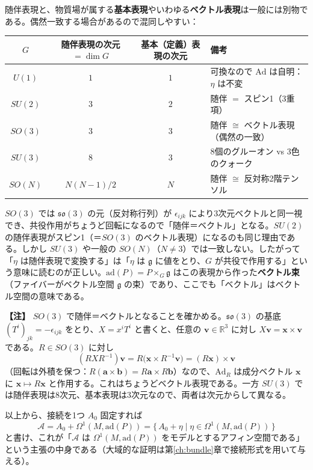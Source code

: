 \documentclass[uplatex, dvipdfmx, book]{jsbook}
\newenvironment{note}{\vspace{1ex}\par\footnotesize\noindent\textbf{【注】}}{\par\vspace{1ex}}
\begin{document}
随伴表現と、物質場が属する\textbf{基本表現}やいわゆる\textbf{ベクトル表現}は一般には別物である。偶然一致する場合があるので混同しやすい：
\begin{center}
\begin{tabular}{c|c|c|l}
    $G$ & 随伴表現の次元 $=\dim G$ & 基本（定義）表現の次元 & 備考 \\ \hline
    $U(1)$ & $1$ & $1$ & 可換なので $\mathrm{Ad}$ は自明：$\eta$ は不変 \\
    $SU(2)$ & $3$ & $2$ & 随伴 $=$ スピン1（3重項） \\
    $SO(3)$ & $3$ & $3$ & 随伴 $\cong$ ベクトル表現（偶然の一致） \\
    $SU(3)$ & $8$ & $3$ & 8個のグルーオン vs 3色のクォーク \\
    $SO(N)$ & $N(N-1)/2$ & $N$ & 随伴 $\cong$ 反対称2階テンソル
\end{tabular}
\end{center}
$SO(3)$ では $\mathfrak{so}(3)$ の元（反対称行列）が $\epsilon_{ijk}$ により3次元ベクトルと同一視でき、共役作用がちょうど回転になるので「随伴＝ベクトル」となる。$SU(2)$ の随伴表現がスピン1（＝$SO(3)$ のベクトル表現）になるのも同じ理由である。しかし $SU(3)$ や一般の $SO(N)$（$N\neq 3$）では一致しない。したがって「$\eta$ は随伴表現で変換する」は「$\eta$ は $\mathfrak{g}$ に値をとり、$G$ が共役で作用する」という意味に読むのが正しい。$\mathrm{ad}(P) = P\times_G\mathfrak{g}$ はこの表現から作った\textbf{ベクトル束}（ファイバーがベクトル空間 $\mathfrak{g}$ の束）であり、ここでも「ベクトル」はベクトル空間の意味である。

\begin{note}
$SO(3)$ で随伴＝ベクトルとなることを確かめる。$\mathfrak{so}(3)$ の基底 $(T^i)_{jk} = -\epsilon_{ijk}$ をとり、$X = x^iT^i$ と書くと、任意の $\bm{v}\in\mathbb{R}^3$ に対し $X\bm{v} = \bm{x}\times\bm{v}$ である。$R \in SO(3)$ に対し
\begin{equation*}
    (RXR^{-1})\bm{v} = R\bigl(\bm{x}\times R^{-1}\bm{v}\bigr) = (R\bm{x})\times\bm{v}
\end{equation*}
（回転は外積を保つ：$R(\bm{a}\times\bm{b}) = R\bm{a}\times R\bm{b}$）なので、$\mathrm{Ad}_R$ は成分ベクトル $\bm{x}$ に $\bm{x}\mapsto R\bm{x}$ と作用する。これはちょうどベクトル表現である。一方 $SU(3)$ では随伴表現は8次元、基本表現は3次元なので、両者は次元からして異なる。
\end{note}
以上から、接続を1つ $A_0$ 固定すれば
\begin{equation*}
    \mathcal{A} = A_0 + \Omega^1(M, \mathrm{ad}(P)) = \{\, A_0 + \eta \mid \eta \in \Omega^1(M, \mathrm{ad}(P)) \,\}
\end{equation*}
と書け、これが「$\mathcal{A}$ は $\Omega^1(M, \mathrm{ad}(P))$ をモデルとするアフィン空間である」という主張の中身である（大域的な証明は第\ref{ch:bundle}章で接続形式を用いて与える）。
\end{document}
